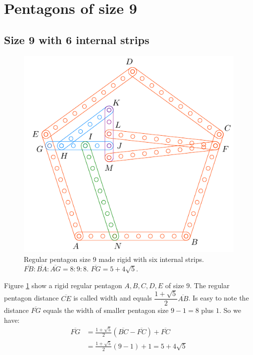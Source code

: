 \documentclass[11pt]{article}
\begin{document}

\section{Pentagons of size 9}

\subsection{Size 9 with 6 internal strips}

\begin{figure}[h]
 \centering
 \includegraphics[scale=0.95]{9/penta9a}
 \caption{Regular pentagon size 9 made rigid with six internal strips. $\overline{FB}:\overline{BA}:\overline{AG} = 8:9:8$. $\overline{FG}=5+4\sqrt5$. }
 \label{fig:penta9a}
\end{figure}

Figure \ref{fig:penta9a} show a rigid regular pentagon $A,B,C,D,E$ of size $9$. The regular pentagon distance $\overline{CE}$ is called width and equals $\dfrac{1+\sqrt5}{2}\overline{AB}$. Is easy to note the distance $\overline{FG}$ equals the width of smaller pentagon size $9-1=8$ plus $1$. So we have:
\begin{align}
\overline{FG} &= \frac{1+\sqrt5}{2}(\overline{BC}-\overline{FC}) + \overline{FC}\nonumber\\
 &= \frac{1+\sqrt5}{2}(9-1) + 1 = 5 + 4\sqrt5
\end{align}
\end{document}
